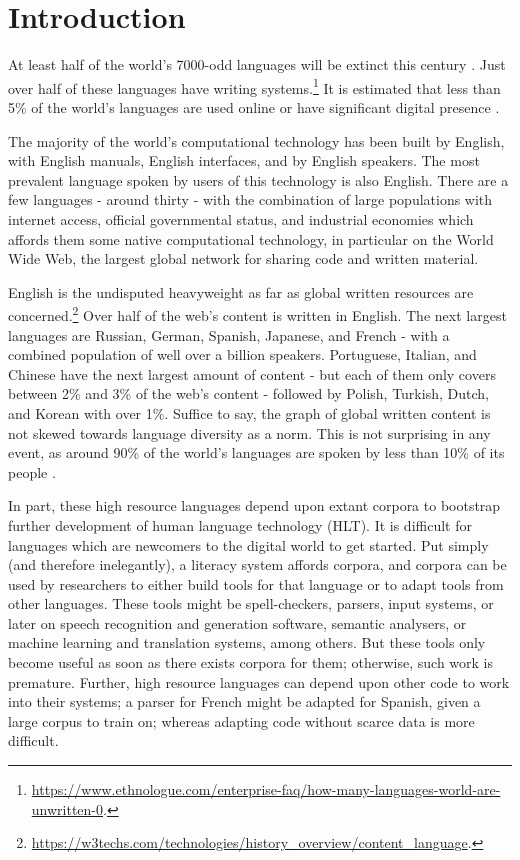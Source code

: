 \section{Introduction}
\label{sec:intro}

At least half of the world's 7000-odd languages will be extinct this century \citep{krauss92, grenoble2011cambridge}. Just over half of these languages have writing systems.\footnote{\href{https://www.ethnologue.com/enterprise-faq/how-many-languages-world-are-unwritten-0}{https://www.ethnologue.com/enterprise-faq/how-many-languages-world-are-unwritten-0}. } It is estimated that less than 5\% of the world's languages are used online or have significant digital presence \citep{kornai2013digital}.

The majority of the world's computational technology has been built by English, with English manuals, English interfaces, and by English speakers. The most prevalent language spoken by users of this technology is also English. There are a few languages - around thirty - with the combination of large populations with internet access, official governmental status, and industrial economies which affords them some native computational technology, in particular on the World Wide Web, the largest global network for sharing code and written material.

English is the undisputed heavyweight as far as global written resources are concerned.\footnote{\href{https://w3techs.com/technologies/history_overview/content_language}{https://w3techs.com/technologies/history\_overview/content\_language}. } Over half of the web's content is written in English. The next largest languages are Russian, German, Spanish, Japanese, and French - with a combined population of well over a billion speakers. Portuguese, Italian, and Chinese have the next largest amount of content - but each of them only covers between 2\% and 3\% of the web's content - followed by Polish, Turkish, Dutch, and Korean with over 1\%. Suffice to say, the graph of global written content is not skewed towards language diversity as a norm. This is not surprising in any event, as around 90\% of the world's languages are spoken by less than 10\% of its people \citep{bernard1992preserving}.

In part, these high resource languages depend upon extant corpora to bootstrap further development of human language technology (HLT). It is difficult for languages which are newcomers to the digital world to get started. %
Put simply (and therefore inelegantly), a literacy system affords corpora, and corpora can be used by researchers to either build tools for that language or to adapt tools from other languages. These tools might be spell-checkers, parsers, input systems, or later on speech recognition and generation software, semantic analysers, or machine learning and translation systems, among others. But these tools only become useful as soon as there exists corpora for them; otherwise, such work is premature. Further, high resource languages can depend upon other code to work into their systems; a parser for French might be adapted for Spanish, given a large corpus to train on; whereas adapting code without scarce data is more difficult.

